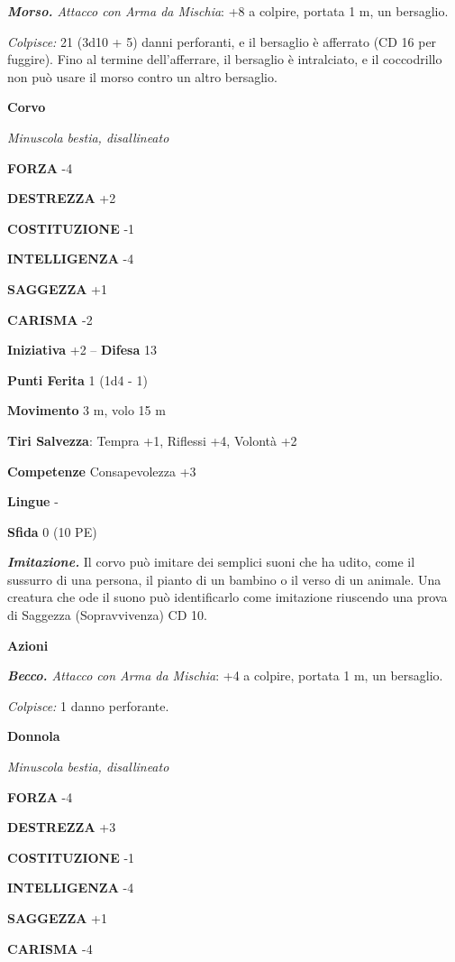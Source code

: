 \begin{multicols}{2}
\emph{\textbf{Morso.} Attacco con Arma da Mischia}: +8 a colpire, portata 1 m, un bersaglio.

\emph{Colpisce:} 21 (3d10 + 5) danni perforanti, e il bersaglio è afferrato (CD 16 per fuggire). Fino al termine dell'afferrare, il bersaglio è intralciato, e il coccodrillo non può usare il morso contro un altro bersaglio.

\medskip\textbf{Corvo}

\emph{Minuscola bestia, disallineato}

\textbf{FORZA} -4

\textbf{DESTREZZA} +2

\textbf{COSTITUZIONE} -1

\textbf{INTELLIGENZA} -4

\textbf{SAGGEZZA} +1

\textbf{CARISMA} -2

\textbf{Iniziativa} +2 -- \textbf{Difesa} 13

\textbf{Punti Ferita} 1 (1d4 - 1)

\textbf{Movimento} 3 m, volo 15 m

\textbf{Tiri Salvezza}: Tempra +1, Riflessi +4, Volontà +2

\textbf{Competenze} Consapevolezza +3

\textbf{Lingue} -

\textbf{Sfida} 0 (10 PE)

\emph{\textbf{Imitazione.}} Il corvo può imitare dei semplici suoni che ha udito, come il sussurro di una persona, il pianto di un bambino o il verso di un animale. Una creatura che ode il suono può identificarlo come imitazione riuscendo una prova di Saggezza (Sopravvivenza) CD 10.

\textbf{Azioni}

\emph{\textbf{Becco.} Attacco con Arma da Mischia}: +4 a colpire, portata 1 m, un bersaglio.

\emph{Colpisce:} 1 danno perforante.

\medskip\textbf{Donnola}

\emph{Minuscola bestia, disallineato}

\textbf{FORZA} -4

\textbf{DESTREZZA} +3

\textbf{COSTITUZIONE} -1

\textbf{INTELLIGENZA} -4

\textbf{SAGGEZZA} +1

\textbf{CARISMA} -4


\end{multicols}
